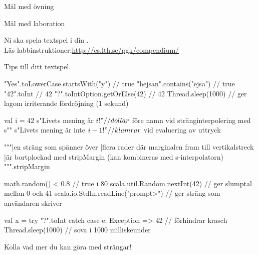 



\ifkompendium\else
{}

\begin{SlideExtra}{Mål med övning \ExeWeekTHREE}
\begin{itemize}\SlideFontSmall
  
\end{itemize}
\end{SlideExtra}

\begin{SlideExtra}{Mål med laboration \LabWeekTHREE}
\begin{itemize}
  
\end{itemize}
Ni ska spela  textspel i din .\\
Läs labbinstruktioner:\url{http://cs.lth.se/pgk/compendium/}
\end{SlideExtra}


\begin{SlideExtra}{Tips till ditt textspel.}
\begin{CodeSmall}
"Yes".toLowerCase.startsWith("y")    // true
"hejsan".contains("ejsa")            // true
"42".toInt                           // 42
"?".toIntOption.getOrElse(42)        // 42
Thread.sleep(1000)                   // ger lagom irriterande fördröjning (1 sekund)

val i = 42
s"Livets mening är $i!" // dollar $ före namn vid stränginterpolering med s""
s"Livets mening är inte ${i-1}!"  // klamrar ${} vid evaluering av uttryck

"""|en sträng som spänner över
   |flera rader där marginalen fram till vertikalstreck
   |är bortplockad med stripMargin (kan kombineras med s-interpolatorn)
""".stripMargin

math.random() < 0.8                  // true i 80%
scala.util.Random.nextInt(42)      // ger slumptal mellan 0 och 41
scala.io.StdIn.readLine("prompt>") // ger sträng som användaren skriver

val x = try { "?".toInt } catch { case e: Exception => 42 }  // förhindrar krasch
Thread.sleep(1000)    // sova i 1000 milliskeunder
\end{CodeSmall}
Kolla  vad mer du kan göra med strängar!
\end{SlideExtra}

